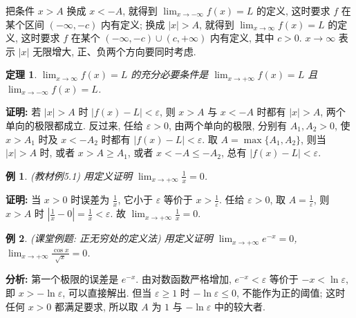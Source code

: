 \documentclass[UTF8,openany]{ctexbook}
\theoremstyle{chinesetextbook}
\newtheorem{example}{例}[section]
\newtheorem{theorem}{定理}[section]
\newenvironment{cnproof}{\par\indent\textbf{证明:} \ignorespaces}{\par}
\begin{document}
把条件 $x>A$ 换成 $x<-A$, 就得到 $\displaystyle\lim_{x\to-\infty}f(x)=L$ 的定义, 这时要求 $f$ 在某个区间 $(-\infty,-c)$ 内有定义; 换成 $|x|>A$, 就得到 $\displaystyle\lim_{x\to\infty}f(x)=L$ 的定义, 这时要求 $f$ 在某个 $(-\infty,-c)\cup(c,+\infty)$ 内有定义, 其中 $c>0$. $x\to\infty$ 表示 $|x|$ 无限增大, 正、负两个方向要同时考虑.
\begin{theorem}
$\displaystyle\lim_{x\to\infty}f(x)=L$ 的充分必要条件是 $\displaystyle\lim_{x\to+\infty}f(x)=L$ 且 $\displaystyle\lim_{x\to-\infty}f(x)=L$.
\end{theorem}
\begin{cnproof}
若 $|x|>A$ 时 $|f(x)-L|<\varepsilon$, 则 $x>A$ 与 $x<-A$ 时都有 $|x|>A$, 两个单向的极限都成立. 反过来, 任给 $\varepsilon>0$, 由两个单向的极限, 分别有 $A_1,A_2>0$, 使 $x>A_1$ 时及 $x<-A_2$ 时都有 $|f(x)-L|<\varepsilon$. 取 $A=\max\{A_1,A_2\}$, 则当 $|x|>A$ 时, 或者 $x>A\ge A_1$, 或者 $x<-A\le-A_2$, 总有 $|f(x)-L|<\varepsilon$.
\end{cnproof}
\begin{example}
\textnormal{(教材例5.1)} 用定义证明 $\displaystyle\lim_{x\to+\infty}\frac1x=0$.
\end{example}
\begin{cnproof}
当 $x>0$ 时误差为 $\displaystyle\frac1x$, 它小于 $\varepsilon$ 等价于 $\displaystyle x>\frac1\varepsilon$. 任给 $\varepsilon>0$, 取 $\displaystyle A=\frac1\varepsilon$, 则 $x>A$ 时 $\displaystyle\left|\frac1x-0\right|=\frac1x<\varepsilon$. 故 $\displaystyle\lim_{x\to+\infty}\frac1x=0$.
\end{cnproof}
\begin{example}
\textnormal{(课堂例题: 正无穷处的定义法)} 用定义证明 $\displaystyle\lim_{x\to+\infty}e^{-x}=0$, $\displaystyle\lim_{x\to+\infty}\frac{\cos x}{\sqrt x}=0$.
\end{example}
\par\indent\textbf{分析:} 第一个极限的误差是 $e^{-x}$. 由对数函数严格增加, $e^{-x}<\varepsilon$ 等价于 $-x<\ln\varepsilon$, 即 $x>-\ln\varepsilon$, 可以直接解出. 但当 $\varepsilon\ge1$ 时 $-\ln\varepsilon\le0$, 不能作为正的阈值; 这时任何 $x>0$ 都满足要求, 所以取 $A$ 为 $1$ 与 $-\ln\varepsilon$ 中的较大者.
\end{document}
